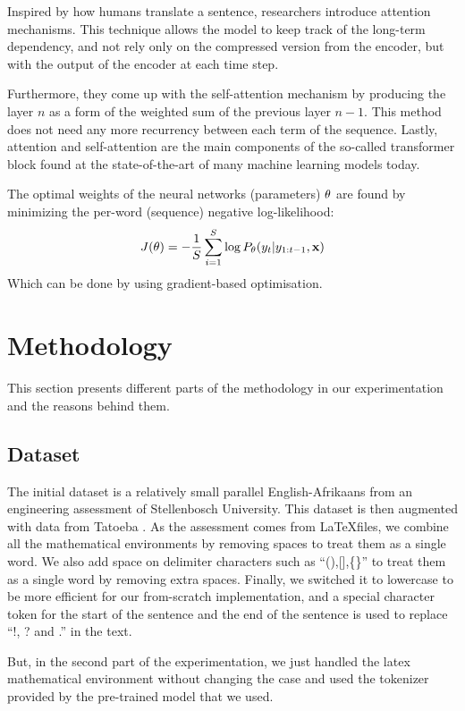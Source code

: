 Inspired by how humans translate a sentence, researchers introduce attention mechanisms. This technique allows the model to keep track of the long-term dependency, and not rely only on the compressed version from the encoder, but with the output of the encoder at each time step.

Furthermore, they come up with the self-attention mechanism by producing the layer  $n$ as a form of the weighted sum of the previous layer $n-1$. This method does not need any more recurrency between each term of the sequence. Lastly, attention and self-attention are the main components of the so-called transformer block found at the state-of-the-art of many machine learning models today.


The optimal weights of the neural networks (parameters) $\mathbf{\theta}$ are found by minimizing the per-word (sequence) negative log-likelihood:
\begin{equation}
	J(\mathbf{\theta}) = -\frac{1}{S}\sum_{i=1}^{S}\log P_{\mathbf{\theta}}(y_t|y_{1:t-1}, \mathbf{x})
\end{equation}
Which can be done by using gradient-based optimisation.

\section{Methodology}\label{mth}
This section presents different parts of the methodology in our experimentation and the reasons behind them.

\subsection{Dataset}
The initial dataset is a relatively small parallel English-Afrikaans from an engineering assessment of Stellenbosch University. This dataset is then augmented with data from Tatoeba \cite{tatoeba}. As the assessment comes from \LaTeX files, we combine all the mathematical environments by removing spaces to treat them as a single word. We also add space on delimiter characters such as ``(),[],\{\}'' to treat them as a single word by removing extra spaces. Finally, we switched it to lowercase to be more efficient for our from-scratch implementation, and a special character token for the start of the sentence and the end of the sentence is used to replace ``!, ? and .'' in the text.


But, in the second part of the experimentation, we just handled the latex mathematical environment without changing the case and used the tokenizer provided by the pre-trained model that we used.

